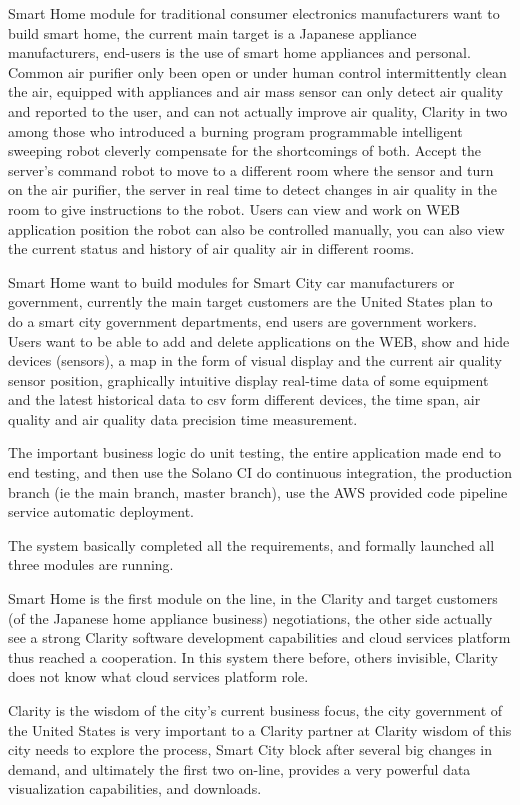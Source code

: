 Smart Home module for traditional consumer electronics manufacturers want to build smart home, the current main target is a Japanese appliance manufacturers, end-users is the use of smart home appliances and personal. Common air purifier only been open or under human control intermittently clean the air, equipped with appliances and air mass sensor can only detect air quality and reported to the user, and can not actually improve air quality, Clarity in two among those who introduced a burning program programmable intelligent sweeping robot cleverly compensate for the shortcomings of both. Accept the server's command robot to move to a different room where the sensor and turn on the air purifier, the server in real time to detect changes in air quality in the room to give instructions to the robot. Users can view and work on WEB application position the robot can also be controlled manually, you can also view the current status and history of air quality air in different rooms.

Smart Home want to build modules for Smart City car manufacturers or government, currently the main target customers are the United States plan to do a smart city government departments, end users are government workers. Users want to be able to add and delete applications on the WEB, show and hide devices (sensors), a map in the form of visual display and the current air quality sensor position, graphically intuitive display real-time data of some equipment and the latest historical data to csv form different devices, the time span, air quality and air quality data precision time measurement.

The important business logic do unit testing, the entire application made end to end testing, and then use the Solano CI do continuous integration, the production branch (ie the main branch, master branch), use the AWS provided code pipeline service automatic deployment.

The system basically completed all the requirements, and formally launched all three modules are running.

Smart Home is the first module on the line, in the Clarity and target customers (of the Japanese home appliance business) negotiations, the other side actually see a strong Clarity software development capabilities and cloud services platform thus reached a cooperation. In this system there before, others invisible, Clarity does not know what cloud services platform role.

Clarity is the wisdom of the city's current business focus, the city government of the United States is very important to a Clarity partner at Clarity wisdom of this city needs to explore the process, Smart City block after several big changes in demand, and ultimately the first two on-line, provides a very powerful data visualization capabilities, and downloads.


